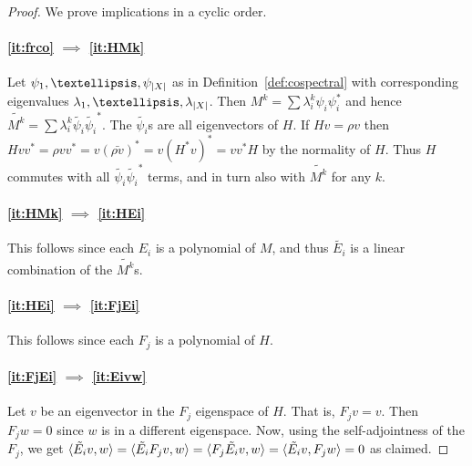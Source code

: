 \documentclass[11pt]{article}
\theoremstyle{definition}
\numberwithin{equation}{section}
\newcommand\+{\mkern2mu}
\newcommand{\1}{\mathbf 1}
\DeclarePairedDelimiter{\abs}{\lvert}{\rvert}
\DeclarePairedDelimiter{\sprod}{\langle}{\rangle}
\begin{document}
\begin{proof} We prove implications in a cyclic order.
\paragraph{\ref{it:frco} $\implies$ \ref{it:HMk}} Let $\psi_1, \dots, \psi_{\abs{X}}$ as in Definition~\ref{def:cospectral} with corresponding eigenvalues $\lambda_1, \dots , \lambda_{\abs{X}}$.
Then $M^k = \sum \lambda_i^k \psi_i \psi_i^*$ and hence $\widetilde{M^k} = \sum \lambda_i^k \tilde{\psi_i} \tilde{\psi_i}^*$. The $\tilde{\psi_i}$s are all eigenvectors of $H$. If $H v = \rho v$ then $H v v^* = \rho v v^* = v (\bar{\rho v})^* = v (H^* v)^*  = v v^* H$ by the normality of $H$. Thus $H$ commutes with all $\tilde{\psi_i} \tilde{\psi_i}^*$ terms, and in turn also with $\widetilde{M^k}$ for any $k$.

\paragraph{\ref{it:HMk} $\implies$ \ref{it:HEi}} This follows since each $E_i$ is a polynomial of $M$, and thus $\tilde{E_i}$ is a linear combination of the $\widetilde{M^k}$s.

\paragraph{\ref{it:HEi} $\implies$ \ref{it:FjEi}} This follows since each $F_j$ is a polynomial of $H$.

\paragraph{\ref{it:FjEi} $\implies$ \ref{it:Eivw}} Let $v$ be an eigenvector in the $F_j$ eigenspace of $H$. That is, $F_j v = v$. Then $F_j w= 0$ since $w$ is in a different eigenspace. Now, using the self-adjointness of the $F_j$, we get $\sprod{\tilde{E_i} v, w} = \sprod{\tilde{E_i} F_j v, w} = \sprod{F_j \tilde{E_i} v, w} = \sprod{\tilde{E_i} v, F_j w} = 0$ as claimed.


\end{proof}
\end{document}
